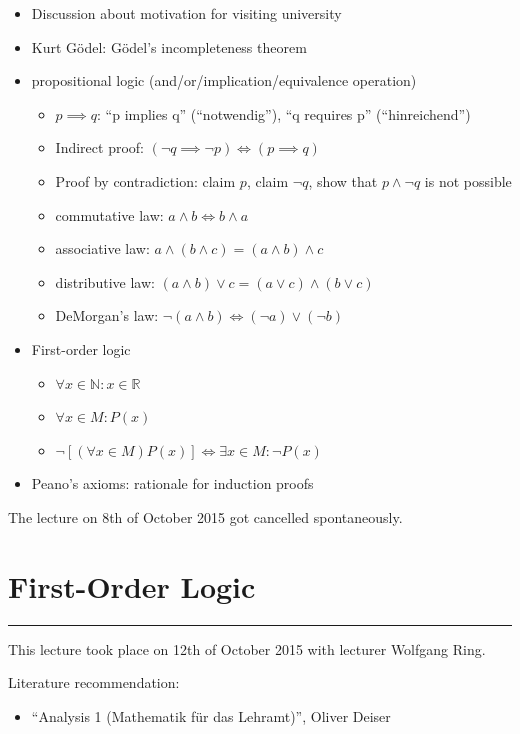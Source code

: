 \documentclass[a4paper,landscape,twocolumn]{article}
\theoremstyle{definition}
\newcommand\meta[3]{\hrule{} This #1 took place on #2 with lecturer #3.\par}
\begin{document}
\begin{itemize}
  \item Discussion about motivation for visiting university
  \item Kurt Gödel: Gödel's incompleteness theorem
  \item propositional logic (and/or/implication/equivalence operation)
  \begin{itemize}
    \item $p \implies q$: \enquote{p implies q} (\enquote{notwendig}), \enquote{q requires p} (\enquote{hinreichend})
    \item Indirect proof: $(\neg q \implies \neg p) \Leftrightarrow (p \implies q)$
    \item Proof by contradiction: claim $p$, claim $\neg q$, show that $p \land \neg q$ is not possible
    \item commutative law: $a \land b \Leftrightarrow b \land a$
    \item associative law: $a \land (b \land c) = (a \land b) \land c$
    \item distributive law: $(a \land b) \lor c = (a \lor c) \land (b \lor c)$
    \item DeMorgan's law: $\neg (a \land b) \Leftrightarrow (\neg a) \lor (\neg b)$
  \end{itemize}
  \item First-order logic
  \begin{itemize}
    \item $\forall x \in \mathbb{N}: x \in \mathbb{R}$
    \item $\forall x \in M: P(x)$
    \item $\neg \left[(\forall x \in M) P(x)\right] \Leftrightarrow \exists x \in M: \neg P(x)$
  \end{itemize}
  \item Peano's axioms: rationale for induction proofs
\end{itemize}

The lecture on 8th of October 2015 got cancelled spontaneously.

\section{First-Order Logic}
\meta{lecture}{12th of October 2015}{Wolfgang Ring}

Literature recommendation:
\begin{itemize}
  \item \enquote{\foreignlanguage{ngerman}{Analysis 1 (Mathematik für das Lehramt)}}, Oliver Deiser
\end{itemize}
\end{document}
